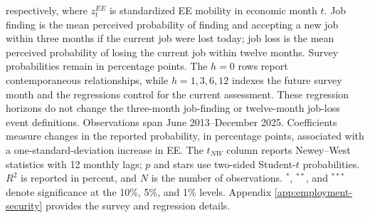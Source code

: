 \begin{table}[H]
\begin{minipage}[t]{\linewidth}
respectively, where $z_t^{EE}$ is standardized EE mobility in economic month $t$. Job finding is the mean perceived probability of finding and accepting a new job within three months if the current job were lost today; job loss is the mean perceived probability of losing the current job within twelve months. Survey probabilities remain in percentage points. The $h=0$ rows report contemporaneous relationships, while $h=1,3,6,12$ indexes the future survey month and the regressions control for the current assessment. These regression horizons do not change the three-month job-finding or twelve-month job-loss event definitions. Observations span June 2013--December 2025. Coefficients measure changes in the reported probability, in percentage points, associated with a one-standard-deviation increase in EE. The $t_{NW}$ column reports Newey--West statistics with 12 monthly lags; $p$ and stars use two-sided Student-$t$ probabilities. $R^2$ is reported in percent, and $N$ is the number of observations. $^{*}$, $^{**}$, and $^{***}$ denote significance at the 10\%, 5\%, and 1\% levels. Appendix \ref{app:employment-security} provides the survey and regression details.\par\end{minipage}
\end{table}
